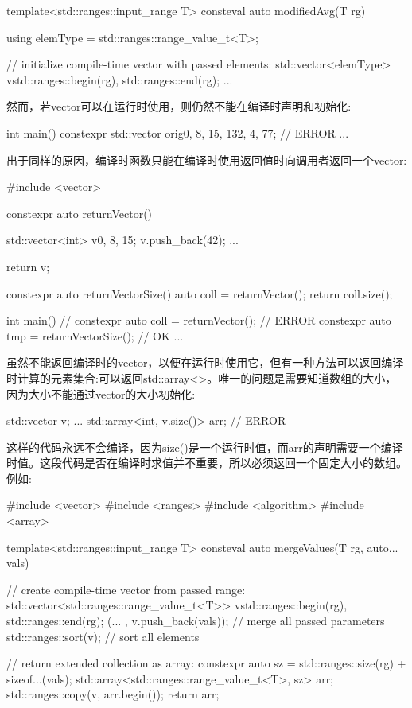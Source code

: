\begin{cpp}
template<std::ranges::input_range T>
consteval auto modifiedAvg(T rg)
{
	using elemType = std::ranges::range_value_t<T>;
	
	// initialize compile-time vector with passed elements:
	std::vector<elemType> v{std::ranges::begin(rg),
							std::ranges::end(rg)};
	...
}
\end{cpp}

然而，若vector可以在运行时使用，则仍然不能在编译时声明和初始化:

\begin{cpp}
int main()
{
	constexpr std::vector orig{0, 8, 15, 132, 4, 77}; // ERROR
	...
}
\end{cpp}

出于同样的原因，编译时函数只能在编译时使用返回值时向调用者返回一个vector:


\begin{cpp}
#include <vector>

constexpr auto returnVector()
{
	std::vector<int> v{0, 8, 15};
	v.push_back(42);
	...
	
	return v;
}

constexpr auto returnVectorSize()
{
	auto coll = returnVector();
	return coll.size();
}
	
int main()
{
	// constexpr auto coll = returnVector(); // ERROR
	constexpr auto tmp = returnVectorSize(); // OK
	...
}
\end{cpp}


虽然不能返回编译时的vector，以便在运行时使用它，但有一种方法可以返回编译时计算的元素集合:可以返回std::array<>。唯一的问题是需要知道数组的大小，因为大小不能通过vector的大小初始化:

\begin{cpp}
std::vector v;
...
std::array<int, v.size()> arr; // ERROR
\end{cpp}

这样的代码永远不会编译，因为size()是一个运行时值，而arr的声明需要一个编译时值。这段代码是否在编译时求值并不重要，所以必须返回一个固定大小的数组。例如:


\begin{cpp}
#include <vector>
#include <ranges>
#include <algorithm>
#include <array>

template<std::ranges::input_range T>
consteval auto mergeValues(T rg, auto... vals)
{
	// create compile-time vector from passed range:
	std::vector<std::ranges::range_value_t<T>> v{std::ranges::begin(rg),
												 std::ranges::end(rg)};
	(... , v.push_back(vals)); // merge all passed parameters
	std::ranges::sort(v); // sort all elements

	// return extended collection as array:
	constexpr auto sz = std::ranges::size(rg) + sizeof...(vals);
	std::array<std::ranges::range_value_t<T>, sz> arr{};
	std::ranges::copy(v, arr.begin());
	return arr;
}
\end{cpp}

